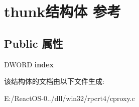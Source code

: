 \hypertarget{structthunk}{}\section{thunk结构体 参考}
\label{structthunk}
\subsection*{Public 属性}
\begin{DoxyCompactItemize}
\item 
\mbox{\label{structthunk_a921d39d57803ef4f6ca4478f23073cac}} 
D\+W\+O\+RD {\bfseries index}
\end{DoxyCompactItemize}


该结构体的文档由以下文件生成\+:\begin{DoxyCompactItemize}
\item 
E\+:/\+React\+O\+S-\/0../dll/win32/rpcrt4/cproxy.\+c\end{DoxyCompactItemize}
